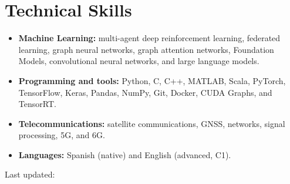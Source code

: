 \documentclass[10.5pt,letterpaper]{article}
\begin{document}
\section{Technical Skills}
\begin{itemize}[leftmargin=1.2em,itemsep=0.1em,topsep=0.05em]
  \item \textbf{Machine Learning:} multi-agent deep reinforcement learning, federated learning, graph neural networks, graph attention networks, Foundation Models, convolutional neural networks, and large language models.
  \item \textbf{Programming and tools:} Python, C, C++, MATLAB, Scala, PyTorch, TensorFlow, Keras, Pandas, NumPy, Git, Docker, CUDA Graphs, and TensorRT.
  \item \textbf{Telecommunications:} satellite communications, GNSS, networks, signal processing, 5G, and 6G.
  \item \textbf{Languages:} Spanish (native) and English (advanced, C1).
\end{itemize}

\vspace{0.5em}
\begin{flushright}
{\small Last updated: \DTMtoday}
\end{flushright}
\end{document}
